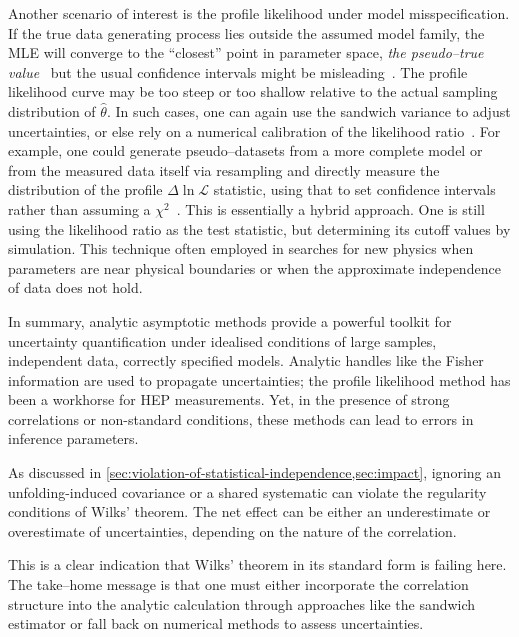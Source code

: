             Another scenario of interest is the profile likelihood under model misspecification.
            If the true data generating process lies outside the assumed model family, the MLE will converge to the ``closest'' point in parameter space, \emph{the pseudo--true value}~\cite{white_maximum_1982, Guardiani:2025lpm} but the usual confidence intervals might be misleading~\cite{tang_is_2025, bortolato_approximate_2022}. 
            The profile likelihood curve may be too steep or too shallow relative to the actual sampling distribution of $\hat{\theta}$.
            In such cases, one can again use the sandwich variance to adjust uncertainties, or else rely on a numerical calibration of the likelihood ratio~\cite{tian_analyzing_2022}.
            For example, one could generate pseudo--datasets from a more complete model or from the measured data itself via resampling and directly measure the distribution of the profile $\Delta\ln\mathcal{L}$ statistic, using that to set confidence intervals rather than assuming a $\chi^2$~\cite{jiang_finite_2024, Kreutz:2011ujb}.
            This is essentially a hybrid approach.
            One is still using the likelihood ratio as the test statistic, but determining its cutoff values by simulation.
            This technique often employed in searches for new physics when parameters are near physical boundaries or when the approximate independence of data does not hold.

        In summary, analytic asymptotic methods provide a powerful toolkit for uncertainty quantification under idealised conditions of large samples, independent data, correctly specified models.
        Analytic handles like the Fisher information are used to propagate uncertainties;
        the profile likelihood method has been a workhorse for HEP measurements.
        Yet, in the presence of strong correlations or non-standard conditions, these methods can lead to errors in inference parameters.
        
        As discussed in \cref{sec:violation-of-statistical-independence,sec:impact}, ignoring an unfolding-induced covariance or a shared systematic can violate the regularity conditions of Wilks’ theorem.
        The net effect can be either an underestimate or overestimate of uncertainties, depending on the nature of the correlation.

        This is a clear indication that Wilks' theorem in its standard form is failing here.
        The take--home message is that one must either incorporate the correlation structure into the analytic calculation through approaches like the sandwich estimator or fall back on numerical methods to assess uncertainties.

